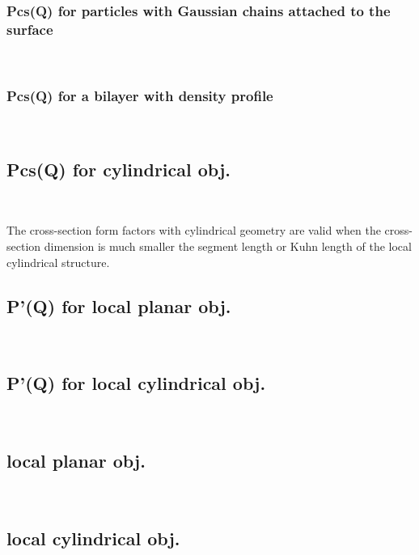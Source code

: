 \clearpage

\subsubsection{Pcs(Q) for  particles with Gaussian chains attached to the
surface} ~\\
\label{plugin:Pcs:GaussianChains}

\vspace{5mm}

\subsubsection{Pcs(Q) for a bilayer with density profile} ~\\
\label{plugin:Pcs:GaussianProfile}


\clearpage
\subsection{Pcs(Q) for cylindrical obj.} ~\\
\label{plugin:Pcs4cylindrical}

The cross-section form factors with cylindrical geometry are valid
when the cross-section dimension is much smaller the segment length
or Kuhn length of the local cylindrical structure.

\subsection{P'(Q) for local planar obj.} ~\\
\label{plugin:Pprime4planar}


\subsection{P'(Q) for local cylindrical obj.} ~\\
\label{plugin:Pprime4cylindrical}

\subsection{local planar  obj.} ~\\
\label{plugin:LocalPlanar)}

\subsection{local cylindrical obj.} ~\\
\label{plugin:LocalCylindrical)}

